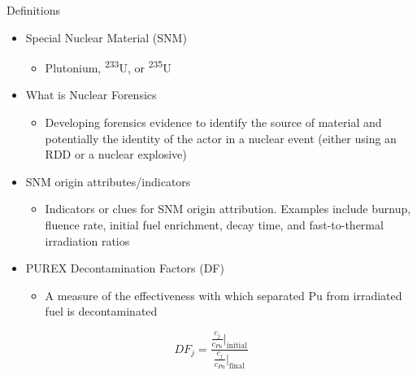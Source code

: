 \documentclass{beamer}
\newcommand{\tss}{\textsuperscript}
\begin{document}
\begin{frame}{Definitions}
  \vspace{-0.7cm}
  \begin{itemize}
  \item{Special Nuclear Material (SNM)}
    \begin{itemize}
    \item{Plutonium, \tss{233}U, or \tss{235}U}
    \end{itemize}
  \item{What is Nuclear Forensics}
    \begin{itemize}
    \item{Developing forensics evidence to identify the source of material and potentially
      the identity of the actor in a nuclear event (either using an RDD or a nuclear explosive)}
    \end{itemize}
  \item{SNM origin attributes/indicators}
    \begin{itemize}
    \item{Indicators or clues for SNM origin attribution. Examples include burnup, fluence rate,
      initial fuel enrichment,
      decay time, and fast-to-thermal irradiation ratios}
    \end{itemize}
  \item{PUREX Decontamination Factors (DF)}
    \begin{itemize}
    \item{A measure of the effectiveness with which separated Pu from irradiated fuel is
      decontaminated}
    \end{itemize}
  \end{itemize}
  \vspace{1mm}
    \begin{equation*}
      DF_j=\frac{\frac{c_j}{c_{Pu}}|_{\text{initial}}}{\frac{c_j}{c_{Pu}}|_{\text{final}}}
    \end{equation*}
\end{frame}
\end{document}

